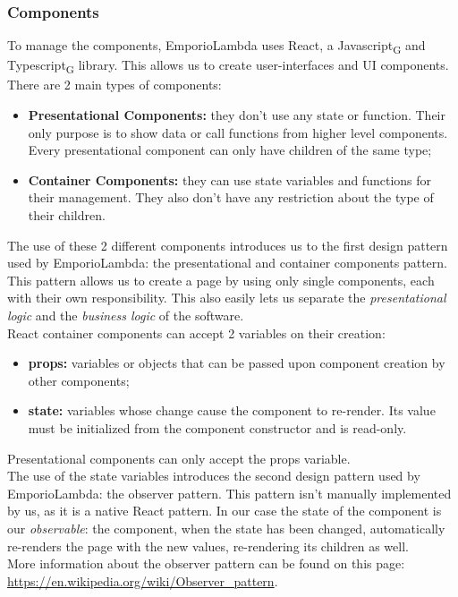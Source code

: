 \subsubsection{Components}
To manage the components, EmporioLambda uses React, a Javascript\textsubscript{G} and Typescript\textsubscript{G} library. This allows us to create user-interfaces and UI components.
There are 2 main types of components:
\begin{itemize}
\item \textbf{Presentational Components:} they don't use any state or function. Their only purpose is to show data or call functions from higher level components. Every presentational component can only have children of the same type;
\item \textbf{Container Components:} they can use state variables and functions for their management. They also don't have any restriction about the type of their children.
\end{itemize}
The use of these 2 different components introduces us to the first design pattern used by EmporioLambda: the presentational and container components pattern. This pattern allows us to create a page by using only single components, each with their own responsibility. This also easily lets us separate the \textit{presentational logic} and the \textit{business logic} of the software.\\
React container components can accept 2 variables on their creation:
\begin{itemize}
\item \textbf{props:} variables or objects that can be passed upon component creation by other components;
\item \textbf{state:} variables whose change cause the component to re-render. Its value must be initialized from the component constructor and is read-only.
\end{itemize}
Presentational components can only accept the props variable.\\
The use of the state variables introduces the second design pattern used by EmporioLambda: the observer pattern. This pattern isn't manually implemented by us, as it is a native React pattern. In our case the state of the component is our \textit{observable}: the component, when the state has been changed, automatically re-renders the page with the new values, re-rendering its children as well.\\More information about the observer pattern can be found on this page:\\
\url{https://en.wikipedia.org/wiki/Observer_pattern}.\\

